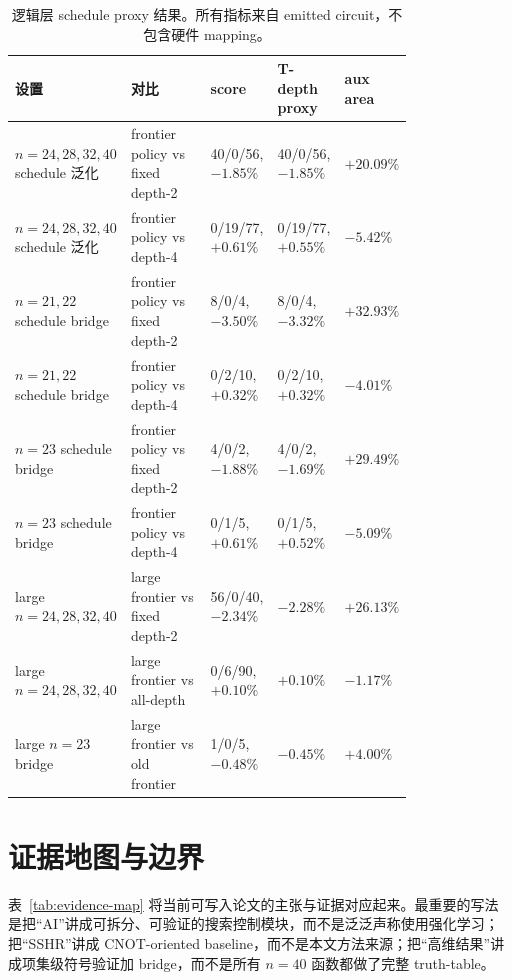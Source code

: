 \documentclass[UTF8,fontset=macnew,11pt]{ctexart}
\newcommand{\ttable}{truth-table}
\begin{document}
\begin{table}[H]
\centering
\tiny
\caption{逻辑层 schedule proxy 结果。所有指标来自 emitted circuit，不包含硬件 mapping。}
\label{tab:schedule}
\begin{tabular}{@{}p{0.20\linewidth}p{0.20\linewidth}p{0.14\linewidth}p{0.15\linewidth}p{0.10\linewidth}@{}}
\toprule
设置 & 对比 & score & T-depth proxy & aux area \\
\midrule
$n=24,28,32,40$ schedule 泛化 & frontier policy vs fixed depth-2 & 40/0/56, $-1.85\%$ & 40/0/56, $-1.85\%$ & $+20.09\%$ \\
$n=24,28,32,40$ schedule 泛化 & frontier policy vs depth-4 & 0/19/77, $+0.61\%$ & 0/19/77, $+0.55\%$ & $-5.42\%$ \\
$n=21,22$ schedule bridge & frontier policy vs fixed depth-2 & 8/0/4, $-3.50\%$ & 8/0/4, $-3.32\%$ & $+32.93\%$ \\
$n=21,22$ schedule bridge & frontier policy vs depth-4 & 0/2/10, $+0.32\%$ & 0/2/10, $+0.32\%$ & $-4.01\%$ \\
$n=23$ schedule bridge & frontier policy vs fixed depth-2 & 4/0/2, $-1.88\%$ & 4/0/2, $-1.69\%$ & $+29.49\%$ \\
$n=23$ schedule bridge & frontier policy vs depth-4 & 0/1/5, $+0.61\%$ & 0/1/5, $+0.52\%$ & $-5.09\%$ \\
large $n=24,28,32,40$ & large frontier vs fixed depth-2 & 56/0/40, $-2.34\%$ & $-2.28\%$ & $+26.13\%$ \\
large $n=24,28,32,40$ & large frontier vs all-depth & 0/6/90, $+0.10\%$ & $+0.10\%$ & $-1.17\%$ \\
large $n=23$ bridge & large frontier vs old frontier & 1/0/5, $-0.48\%$ & $-0.45\%$ & $+4.00\%$ \\
\bottomrule
\end{tabular}
\end{table}

\section{证据地图与边界}

表~\ref{tab:evidence-map} 将当前可写入论文的主张与证据对应起来。最重要的写法是把“AI”讲成可拆分、可验证的搜索控制模块，而不是泛泛声称使用强化学习；把“SSHR”讲成 CNOT-oriented baseline，而不是本文方法来源；把“高维结果”讲成项集级符号验证加 bridge，而不是所有 $n=40$ 函数都做了完整 \ttable{}。
\end{document}
